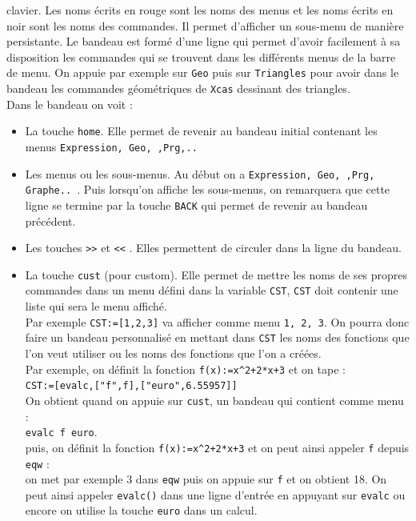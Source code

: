 \documentclass[a4paper,11pt]{article}
\begin{document}
\begin{itemize}
\begin{itemize}
clavier. Les noms \'ecrits  en rouge sont les noms des menus et les noms 
\'ecrits en noir  sont les noms des commandes.
Il permet d'afficher un sous-menu de mani\`ere persistante.
Le bandeau est form\'e d'une ligne qui permet d'avoir facilement \`a sa 
disposition les commandes qui se trouvent dans les diff\'erents menus de la 
barre de menu. 
On appuie par exemple sur {\tt Geo} puis sur {\tt Triangles} pour avoir dans 
le bandeau les commandes g\'eom\'etriques de {\tt Xcas} dessinant des 
triangles. \\
Dans le bandeau on voit :
\begin{itemize}
\item La touche {\tt home}. Elle permet de revenir au bandeau initial contenant
les menus {\tt Expression, Geo, ,Prg,..}
\item Les menus ou les sous-menus. Au d\'ebut on a 
{\tt Expression, Geo, ,Prg, Graphe.. }. Puis lorsqu'on affiche les sous-menus, 
on remarquera que cette ligne se  termine par la touche {\tt BACK} qui permet 
de revenir au bandeau pr\'ec\'edent.
\item Les touches {\tt >>} et {\tt <<} . Elles permettent de circuler dans la 
ligne du bandeau.
\item La touche {\tt cust} \label{sec:cust} (pour custom). Elle permet de  
mettre les  noms de ses propres commandes dans un menu d\'efini dans 
la variable {\tt CST}, {\tt CST} doit contenir une liste qui sera le menu 
affich\'e.\\
Par exemple {\tt CST:=[1,2,3]} va afficher comme menu {\tt 1, 2, 3}.
On pourra donc faire un bandeau personnalis\'e en  mettant dans {\tt CST} les 
noms des fonctions que l'on veut utiliser ou les noms des fonctions que 
l'on a cr\'e\'ees.\\
Par exemple, on d\'efinit la fonction {\tt f(x):=x\verb|^|2+2*x+3} et on 
tape :\\
{\tt CST:=[evalc,["f",f],["euro",6.55957]]} \\
On obtient quand on appuie sur {\tt cust}, un bandeau qui contient comme 
menu :\\
{\tt evalc f euro}.\\
puis, on d\'efinit la fonction {\tt f(x):=x\verb|^|2+2*x+3} et on peut ainsi 
appeler {\tt f} depuis {\tt eqw} :\\
on met par exemple 3 dans {\tt eqw} puis on appuie sur {\tt f} et on obtient 
18.
On peut ainsi appeler {\tt evalc()} dans une ligne d'entr\'ee en appuyant sur 
{\tt evalc}
ou encore on utilise la touche {\tt euro} dans un calcul.
 \end{itemize}

\end{itemize}
\end{itemize}
\end{document}
